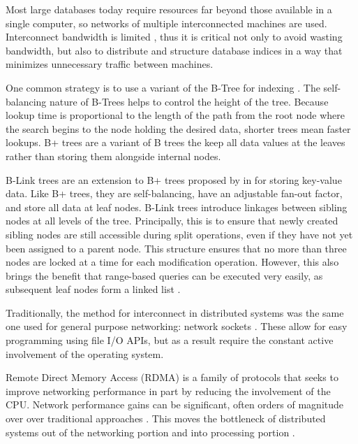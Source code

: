 
\label{sec:indexing}

Most large databases today require resources far beyond those available in a single computer, so networks of multiple interconnected machines are used. Interconnect bandwidth is limited \autocite{binnig-vldb-2016}, thus it is critical not only to avoid wasting bandwidth, but also to distribute and structure database indices in a way that minimizes unnecessary traffic between machines.

One common strategy is to use a variant of the B-Tree for indexing \autocite{ma-tpds-2022}. The self-balancing nature of B-Trees helps to control the height of the tree. Because lookup time is proportional to the length of the path from the root node where the search begins to the node holding the desired data, shorter trees mean faster lookups. B+ trees are a variant of B trees the keep all data values at the leaves rather than storing them alongside internal nodes.

B-Link trees are an extension to B+ trees proposed by \citeauthor{b-link} in \citeyear{b-link} for storing key-value data. Like B+ trees, they are self-balancing, have an adjustable fan-out factor, and store all data at leaf nodes.
B-Link trees introduce linkages between sibling nodes at all levels of the tree. Principally, this is to ensure that newly created sibling nodes are still accessible during split operations, even if they have not yet been assigned to a parent node. This structure ensures that no more than three nodes are locked at a time for each modification operation. However, this also brings the benefit that range-based queries can be executed very easily, as subsequent leaf nodes form a linked list \autocite{b-link}.


\label{sec:rdma}

Traditionally, the method for interconnect in distributed systems was the same one used for general purpose networking: network sockets \autocite{binnig-vldb-2016}. These allow for easy programming using file I/O APIs, but as a result require the constant active involvement of the operating system.

Remote Direct Memory Access (RDMA) is a family of protocols that seeks to improve networking performance in part by reducing the involvement of the CPU. Network performance gains can be significant, often orders of magnitude over over traditional approaches \autocite{ma-tpds-2022,rdma-reads}. This moves the bottleneck of distributed systems out of the networking portion and into processing portion \autocite{binnig-vldb-2016}.

